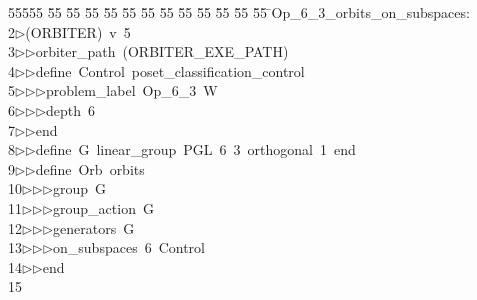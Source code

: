 %
%
\begin{tabbing}
55555 \= 55 \= 55 \= 55 \= 55 \= 55 \= 55 \= 55 \= 55 \= 55 \= 55 \= 55 \= 55 \= \>Op\_6\_3\_orbits\_on\_subspaces:\\[0pt]
2\>$\triangleright$\>(ORBITER)\ v\ 5\ \\[0pt]
3\>$\triangleright$\>$\triangleright$\>orbiter\_path\ (ORBITER\_EXE\_PATH)\ \\[0pt]
4\>$\triangleright$\>$\triangleright$\>define\ Control\ poset\_classification\_control\ \\[0pt]
5\>$\triangleright$\>$\triangleright$\>$\triangleright$\>problem\_label\ Op\_6\_3\ W\ \\[0pt]
6\>$\triangleright$\>$\triangleright$\>$\triangleright$\>depth\ 6\ \\[0pt]
7\>$\triangleright$\>$\triangleright$\>end\ \\[0pt]
8\>$\triangleright$\>$\triangleright$\>define\ G\ linear\_group\ PGL\ 6\ 3\ orthogonal\ 1\ end\ \\[0pt]
9\>$\triangleright$\>$\triangleright$\>define\ Orb\ orbits\ \\[0pt]
10\>$\triangleright$\>$\triangleright$\>$\triangleright$\>group\ G\ \\[0pt]
11\>$\triangleright$\>$\triangleright$\>$\triangleright$\>group\_action\ G\ \\[0pt]
12\>$\triangleright$\>$\triangleright$\>$\triangleright$\>generators\ G\ \\[0pt]
13\>$\triangleright$\>$\triangleright$\>$\triangleright$\>on\_subspaces\ 6\ Control\ \\[0pt]
14\>$\triangleright$\>$\triangleright$\>end\\[0pt]
15\>\end{tabbing}

